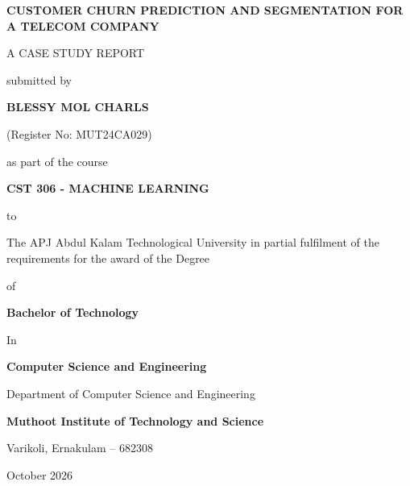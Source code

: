 \documentclass[12pt,a4paper]{report}
\begin{document}

\begin{titlepage}
\begin{center}
    \vspace*{0.5cm}
    {\bfseries\LARGE CUSTOMER CHURN PREDICTION AND SEGMENTATION FOR A TELECOM COMPANY\par}
    
    \vspace{1.5cm}
    {\large A CASE STUDY REPORT\par}
    \vspace{0.4cm}
    {\large submitted by\par}
    \vspace{0.4cm}
    {\large\bfseries BLESSY MOL CHARLS\par}
    {\large (Register No: MUT24CA029)\par}
    
    \vspace{1.0cm}
    {\large as part of the course\par}
    \vspace{0.2cm}
    {\large\bfseries CST 306 - MACHINE LEARNING\par}
    
    \vspace{1.2cm}
    {\large to\par}
    \vspace{0.2cm}
    {\large The APJ Abdul Kalam Technological University in partial fulfilment of the requirements for the award of the Degree\par}
    \vspace{0.2cm}
    {\large of\par}
    \vspace{0.2cm}
    {\large\bfseries Bachelor of Technology\par}
    \vspace{0.2cm}
    {\large In\par}
    \vspace{0.2cm}
    {\large\bfseries Computer Science and Engineering\par}
    
    \vspace{1.2cm}
    {\large Department of Computer Science and Engineering\par}
    \vspace{0.2cm}
    {\large\bfseries Muthoot Institute of Technology and Science\par}
    \vspace{0.1cm}
    {\large Varikoli, Ernakulam -- 682308\par}
    \vspace{0.4cm}
    {\large October 2026\par}
\end{center}
\end{titlepage}
\end{document}
